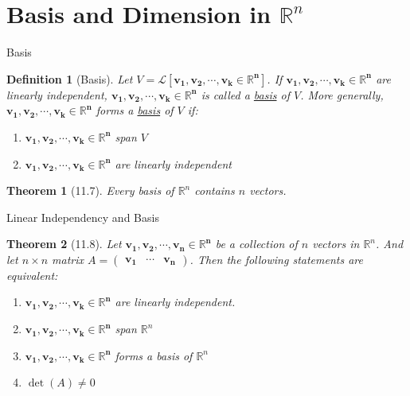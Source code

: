 \documentclass[final]{beamer}
\newtheorem{defn}{Definition}
\newtheorem{thm}{Theorem}
\begin{document}

\section{Basis and Dimension in $\mathbb{R}^n$} %
\label{sec:basis_and_dimension_in_mathbb_r_n}
\begin{frame}[t]{Basis}
	\begin{defn}
		[Basis] Let $V=\mathcal{L}[\mathbf{v_1,v_2,\cdots,v_k\in\mathbb{R}^n}]$. If $\mathbf{v_1,v_2,\cdots,v_k\in\mathbb{R}^n}$ are linearly independent, $\mathbf{v_1,v_2,\cdots,v_k\in\mathbb{R}^n}$ is called a \uline{basis} of $V$. More generally,  $\mathbf{v_1,v_2,\cdots,v_k\in\mathbb{R}^n}$ forms a \uline{basis} of $V$ if:
		\begin{enumerate}
			\item $\mathbf{v_1,v_2,\cdots,v_k\in\mathbb{R}^n}$ span $V$
			\item $\mathbf{v_1,v_2,\cdots,v_k\in\mathbb{R}^n}$ are linearly independent
		\end{enumerate}
	\end{defn}
	\begin{thm}
		[11.7] Every basis of $\mathbb{R}^n$ contains $n$ vectors.
	\end{thm}
\end{frame}

\begin{frame}[t]{Linear Independency and Basis}
	\begin{thm}
		[11.8] Let $\mathbf{v_1,v_2,\cdots,v_n\in\mathbb{R}^n}$ be a collection of $n$ vectors in $\mathbb{R}^n$. And let $n\times n$ matrix $A = \begin{pmatrix}
			\mathbf{v_1}&\cdots&\mathbf{v_n}
		\end{pmatrix}$. Then the following statements are equivalent:
		\begin{enumerate}
			\item $\mathbf{v_1,v_2,\cdots,v_k\in\mathbb{R}^n}$ are linearly independent.
			\item $\mathbf{v_1,v_2,\cdots,v_k\in\mathbb{R}^n}$ span $\mathbb{R}^n$
			\item $\mathbf{v_1,v_2,\cdots,v_k\in\mathbb{R}^n}$ forms a basis of $\mathbb{R}^n$
			\item $\det(A)\neq 0$
		\end{enumerate}
	\end{thm}
\end{frame}
\end{document}
